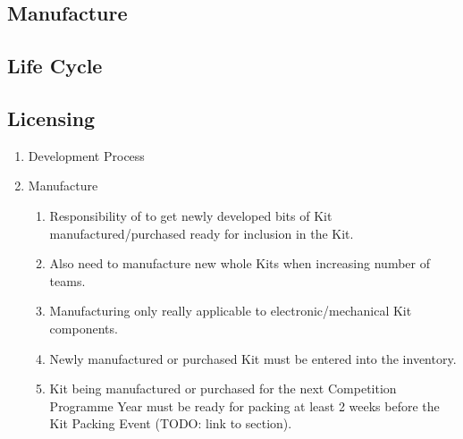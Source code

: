 \begin{draft}
\subsection{Manufacture}

\subsection{Life Cycle}

\subsection{Licensing}

\begin{enumerate}

\item Development Process
\item Manufacture
  \begin{enumerate}
    \item Responsibility of  to get newly developed bits of Kit manufactured/purchased ready for inclusion in the Kit.
    \item Also need to manufacture new whole Kits when increasing number of teams.
    \item Manufacturing only really applicable to electronic/mechanical Kit components.
    \item Newly manufactured or purchased Kit must be entered into the inventory.
    \item Kit being manufactured or purchased for the next Competition Programme Year must be ready for packing at least 2 weeks before the Kit Packing Event (TODO: link to section).
  \end{enumerate}


\end{enumerate}
\end{draft}
